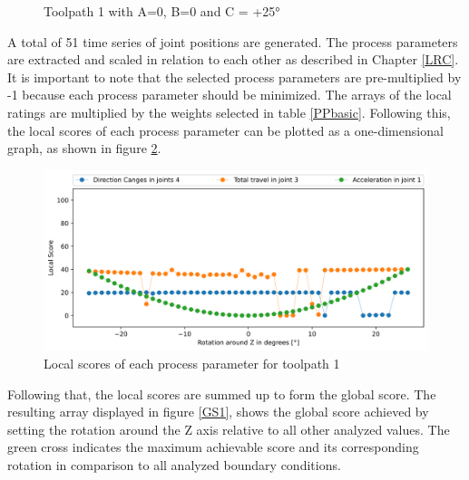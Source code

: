 \begin{figure}[H]
\begin{minipage}{0.5\textwidth}
		\caption{Toolpath 1 with A=0, B=0 and C = +25°}
		\label{TP1+25}
	\end{minipage}\par
\end{figure}

A total of 51 time series of joint positions are generated. The process parameters are extracted and scaled in relation to each other as described in Chapter \ref{LRC}. It is important to note that the selected process parameters are pre-multiplied by -1 because each process parameter should be minimized.
\newpage
The arrays of the local ratings are multiplied by the weights selected in table \ref{PPbasic}.
Following this, the local scores of each process parameter can be plotted as a one-dimensional graph, as shown in figure \ref{LS1}. %

\begin{figure}[H]
	\centerline{\includegraphics[width=1\textwidth]{figures/LocalScores_1.png}}
	\caption{Local scores of each process parameter for toolpath 1}
	\label{LS1}
\end{figure}


Following that, the local scores are summed up to form the global score. The resulting array displayed in figure \ref{GS1}, shows the global score achieved by setting the rotation around the Z axis relative to all other analyzed values. The green cross indicates the maximum achievable score and its corresponding rotation in comparison to all analyzed boundary conditions.


